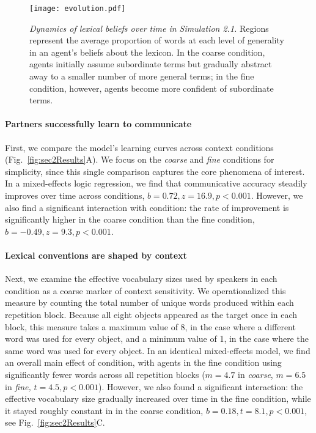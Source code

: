 \begin{figure}[h]
\begin{center}
\texttt{[image: evolution.pdf]}
\caption{\emph{Dynamics of lexical beliefs over time in Simulation 2.1.} Regions represent the average proportion of words at each level of generality in an agent's beliefs about the lexicon. In the coarse condition, agents initially assume subordinate terms but gradually abstract away to a smaller number of more general terms; in the fine condition, however, agents become more confident of subordinate terms.}
\label{fig:evolution}
\end{center}
\end{figure}

\paragraph{Partners successfully learn to communicate}


First, we compare the model's learning curves across context conditions (Fig.~\ref{fig:sec2Results}A). 
We focus on the \emph{coarse} and \emph{fine} conditions for simplicity, since this single comparison captures the core phenomena of interest.
In a mixed-effects logic regression, we find that communicative accuracy steadily improves over time across conditions, $b=0.72, z = 16.9, p<0.001$.
However, we also find a significant interaction with condition: the rate of improvement is significantly higher in the coarse condition than the fine condition, $b=-0.49, z=9.3, p <0.001$. 

\paragraph{Lexical conventions are shaped by context}

Next, we examine the effective vocabulary sizes used by speakers in each condition as a coarse marker of context sensitivity. 
We operationalized this measure by counting the total number of unique words produced within each repetition block.
Because all eight objects appeared as the target once in each block, this measure takes a maximum value of 8, in the case where a different word was used for every object, and a minimum value of 1, in the case where the same word was used for every object.
In an identical mixed-effects model, we find an overall main effect of condition, with agents in the fine condition using significantly fewer words across all repetition blocks ($m = 4.7$ in \emph{coarse}, $m=6.5$ in \emph{fine,} $t = 4.5, p < 0.001$).
However, we also found a significant interaction: the effective vocabulary size gradually increased over time in the fine condition, while it stayed roughly constant in in the coarse condition, $b = 0.18, t = 8.1, p < 0.001$, see Fig.~\ref{fig:sec2Results}C.

